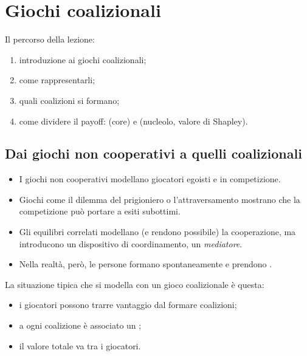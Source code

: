 \chapter{Giochi coalizionali}

\parteteoria

Il percorso della lezione:
\begin{enumerate}[label=\arabic*.]
  \item introduzione ai giochi coalizionali;
  \item come rappresentarli;
  \item quali coalizioni si formano;
  \item come dividere il payoff:  (core) e  (nucleolo, valore di
        Shapley).
\end{enumerate}

\section{Dai giochi non cooperativi a quelli coalizionali}

\begin{itemize}
  \item I giochi non cooperativi modellano giocatori egoisti e in competizione.
  \item Giochi come il dilemma del prigioniero o l'attraversamento mostrano che la
        competizione può portare a esiti subottimi.
  \item Gli equilibri correlati modellano (e rendono possibile) la cooperazione, ma
        introducono un dispositivo di coordinamento, un \emph{mediatore}.
  \item Nella realtà, però, le persone formano spontaneamente  e prendono
        .
\end{itemize}

La situazione tipica che si modella con un gioco coalizionale è questa:
\begin{itemize}
  \item i giocatori possono trarre vantaggio dal formare coalizioni;
  \item a ogni coalizione è associato un ;
  \item il valore totale va  tra i giocatori.
\end{itemize}

